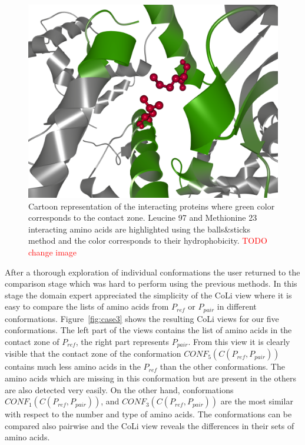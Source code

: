 \documentclass[journal]{vgtc}                %
\begin{document}
\begin{figure}[bt]
  \centering
  \includegraphics[width=0.8\columnwidth]{contact.png}
  \caption{Cartoon representation of the interacting proteins where green color corresponds to the contact zone. Leucine 97 and Methionine 23 interacting amino acids are highlighted using the balls\&sticks method and the color corresponds to their hydrophobicity. \textcolor{red}{TODO change image}}
  \label{fig:contact}
\end{figure}

After a thorough exploration of individual conformations the user returned to the comparison stage which was hard to perform using the previous methods.
In this stage the domain expert appreciated the simplicity of the CoLi view where it is easy to compare the lists of amino acids from $P_{ref}$ or $P_{pair}$ in different conformations. 
Figure~\ref{fig:case3} shows the resulting CoLi views for our five conformations.
The left part of the views contains the list of amino acids in the contact zone of $P_{ref}$, the right part represents $P_{pair}$.
From this view it is clearly visible that the contact zone of the conformation $CONF_5(C(P_{ref},P_{pair}))$ contains much less amino acids in the $P_{ref}$ than the other conformations. 
The amino acids which are missing in this conformation but are present in the others are also detected very easily.
On the other hand, conformations $CONF_1(C(P_{ref},P_{pair}))$, and $CONF_3(C(P_{ref},P_{pair}))$ are the most similar with respect to the number and type of amino acids. 
The conformations can be compared also pairwise and the CoLi view reveals the differences in their sets of amino acids.
\end{document}
